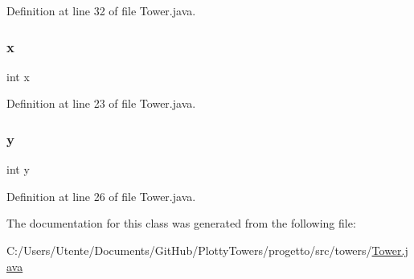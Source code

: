 Definition at line 32 of file Tower.\+java.

\mbox{\label{classtowers_1_1_tower_a6150e0515f7202e2fb518f7206ed97dc}} 
\subsubsection{\texorpdfstring{x}{x}}
{\footnotesize\ttfamily int x\hspace{0.3cm}{\ttfamily [private]}}



Definition at line 23 of file Tower.\+java.

\mbox{\label{classtowers_1_1_tower_a0a2f84ed7838f07779ae24c5a9086d33}} 
\subsubsection{\texorpdfstring{y}{y}}
{\footnotesize\ttfamily int y\hspace{0.3cm}{\ttfamily [private]}}



Definition at line 26 of file Tower.\+java.



The documentation for this class was generated from the following file\+:\begin{DoxyCompactItemize}
\item 
C\+:/\+Users/\+Utente/\+Documents/\+Git\+Hub/\+Plotty\+Towers/progetto/src/towers/\hyperlink{_tower_8java}{Tower.\+java}\end{DoxyCompactItemize}
